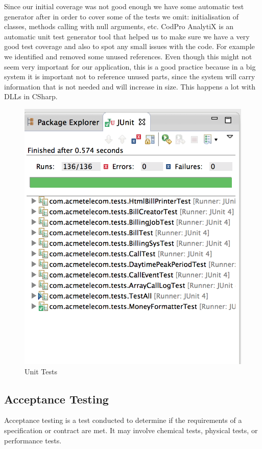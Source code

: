 \documentclass[11pt,twocolumn]{article} %
\begin{document}
Since our initial coverage was not good enough we have some automatic test generator after in order to cover some of the tests we omit: initialisation of classes, methods calling with null arguments, etc. 
CodPro AnalytiX\cite{codePro}  is an automatic unit test generator tool that helped us to make sure we have a very good test coverage and also to spot any small issues with the code. 
For example we identified and removed some unused references. Even though this might not seem very important for our application, this is a good practice because in a 
big system it is important not to reference unused parts, since the system will carry information that is not needed and will increase in size. This happens a lot with DLLs in CSharp. 
\begin{figure}[!ht]
\centering
\includegraphics[scale=0.40]{cod_pro_analytix.png}
\caption{Unit Tests}
\end{figure}

\subsection{Acceptance Testing}
Acceptance testing is a test conducted to determine if the requirements of a specification or contract are met. 
It may involve chemical tests, physical tests, or performance tests.
\end{document}
